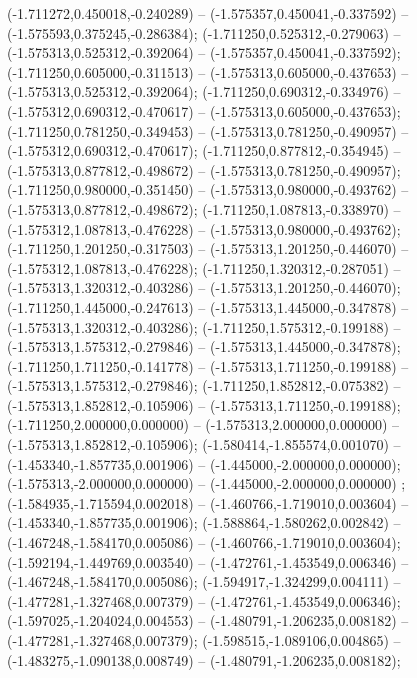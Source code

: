  (-1.711272,0.450018,-0.240289) -- (-1.575357,0.450041,-0.337592) -- (-1.575593,0.375245,-0.286384);
 (-1.711250,0.525312,-0.279063) -- (-1.575313,0.525312,-0.392064) -- (-1.575357,0.450041,-0.337592);
 (-1.711250,0.605000,-0.311513) -- (-1.575313,0.605000,-0.437653) -- (-1.575313,0.525312,-0.392064);
 (-1.711250,0.690312,-0.334976) -- (-1.575312,0.690312,-0.470617) -- (-1.575313,0.605000,-0.437653);
 (-1.711250,0.781250,-0.349453) -- (-1.575313,0.781250,-0.490957) -- (-1.575312,0.690312,-0.470617);
 (-1.711250,0.877812,-0.354945) -- (-1.575313,0.877812,-0.498672) -- (-1.575313,0.781250,-0.490957);
 (-1.711250,0.980000,-0.351450) -- (-1.575313,0.980000,-0.493762) -- (-1.575313,0.877812,-0.498672);
 (-1.711250,1.087813,-0.338970) -- (-1.575312,1.087813,-0.476228) -- (-1.575313,0.980000,-0.493762);
 (-1.711250,1.201250,-0.317503) -- (-1.575313,1.201250,-0.446070) -- (-1.575312,1.087813,-0.476228);
 (-1.711250,1.320312,-0.287051) -- (-1.575313,1.320312,-0.403286) -- (-1.575313,1.201250,-0.446070);
 (-1.711250,1.445000,-0.247613) -- (-1.575313,1.445000,-0.347878) -- (-1.575313,1.320312,-0.403286);
 (-1.711250,1.575312,-0.199188) -- (-1.575313,1.575312,-0.279846) -- (-1.575313,1.445000,-0.347878);
 (-1.711250,1.711250,-0.141778) -- (-1.575313,1.711250,-0.199188) -- (-1.575313,1.575312,-0.279846);
 (-1.711250,1.852812,-0.075382) -- (-1.575313,1.852812,-0.105906) -- (-1.575313,1.711250,-0.199188);
 (-1.711250,2.000000,0.000000) -- (-1.575313,2.000000,0.000000) -- (-1.575313,1.852812,-0.105906);
 (-1.580414,-1.855574,0.001070) -- (-1.453340,-1.857735,0.001906) -- (-1.445000,-2.000000,0.000000);
 (-1.575313,-2.000000,0.000000) -- (-1.445000,-2.000000,0.000000) ;
 (-1.584935,-1.715594,0.002018) -- (-1.460766,-1.719010,0.003604) -- (-1.453340,-1.857735,0.001906);
 (-1.588864,-1.580262,0.002842) -- (-1.467248,-1.584170,0.005086) -- (-1.460766,-1.719010,0.003604);
 (-1.592194,-1.449769,0.003540) -- (-1.472761,-1.453549,0.006346) -- (-1.467248,-1.584170,0.005086);
 (-1.594917,-1.324299,0.004111) -- (-1.477281,-1.327468,0.007379) -- (-1.472761,-1.453549,0.006346);
 (-1.597025,-1.204024,0.004553) -- (-1.480791,-1.206235,0.008182) -- (-1.477281,-1.327468,0.007379);
 (-1.598515,-1.089106,0.004865) -- (-1.483275,-1.090138,0.008749) -- (-1.480791,-1.206235,0.008182);
